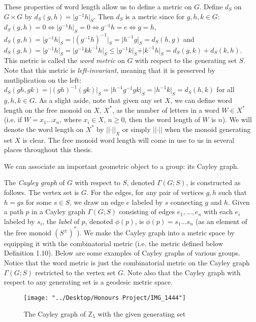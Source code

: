 \documentclass[12pt]{article}
\newcommand{\vs}{\vskip10pt}
\begin{document}
	These properties of word length allow us to define a metric on $G$. Define $d_S$ on $G \times G$ by $d_S(g,h) = \vert g^{-1}h \vert_S$. Then $d_S$ is a metric since for $g,h,k \in G$: $d_S(g,h) = 0 \iff \vert g^{-1} h \vert_S = 0 \iff g^{-1} h = e \iff g = h$, $d_S(g,h) = \vert g^{-1}h \vert_S = \vert (g^{-1}h)^{-1} \vert_S = \vert h^{-1} g \vert_S = d_S(h,g)$ and $d_S(g,h) = \vert g^{-1} h \vert_S = \vert g^{-1} k k^{-1} h \vert_S \leq \vert g^{-1} k \vert_S + \vert k^{-1} h \vert_S = d_S(g,k) + d_S(k,h)$. This metric is called the \textit{word metric} on $G$ with respect to the generating set $S$. Note that this metric is \textit{left-invariant}, meaning that it is preserved by mutliplication on the left: $d_S(gh,gk) = \vert (gh)^{-1} (gk) \vert_S = \vert h^{-1} g^{-1} g k \vert_S = \vert h^{-1} k \vert_S = d_S(h,k)$ for all $g,h,k \in G$. As a slight aside, note that given any set $X$, we can define word length on the free monoid on $X$, $X^*$, as the number of letters in a word $W \in X^*$ (i.e. if $W = x_1...x_n$, where $x_i \in X$, $n \geq 0$, then the word length of $W$ is $n$). We will denote the word length on $X^*$ by $\vert \vert \cdot \vert \vert_X$ or simply $\vert \vert \cdot \vert \vert$ when the monoid generating set $X$ is clear. The free monoid word length will come in use to us in several places throughout this thesis.
	
	\vs 
	
	We can associate an important geometric object to a group: its Cayley graph.
	
	\vs 
	
	The \textit{Cayley graph} of $G$ with respect to $S$, denoted $\Gamma(G; S)$, is constructed as follows. The vertex set is $G$. For the edges, for any pair of vertices $g, h$ such that $h = gs$ for some $s \in S$, we draw an edge $e$ labeled by $s$ connecting $g$ and $h$. Given a path $p$ in a Cayley graph $\Gamma(G;S)$ consisting of edges $e_1,...,e_n$ with each $e_i$ labeled by $s_i$, the \textit{label} of $p$, denoted $\phi(p)$, is $\phi(p) = s_1...s_n$ (as an element of the free monoid $(S^{\pm})^*$). We make the Cayley graph into a metric space by equipping it with the combinatorial metric (i.e. the metric defined below Definition 1.10). Below are some examples of Cayley graphs of various groups. Notice that the word metric is just the combinatorial metric on the Cayley graph $\Gamma(G; S)$ restricted to the vertex set $G$. Note also that the Cayley graph with respect to any generating set is a geodesic metric space. 
	
	
\begin{figure} [H]
	\centering
	\texttt{[image: "../Desktop/Honours Project/IMG\_1444"]}
	\caption{The Cayley graph of $\mathbb{Z}_5$ with the given generating set}
	\label{fig:img1444}
\end{figure}
\end{document}
